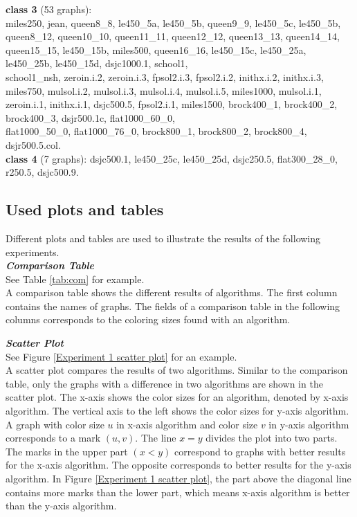 \documentclass[12pt,a4paper,twoside]{scrartcl}
\numberwithin{equation}{section}
\begin{document}
\textbf{class 3} (53 graphs):\\ miles250, jean, queen8\_8, le450\_5a, le450\_5b, queen9\_9, le450\_5c, le450\_5b, queen8\_12, queen10\_10, queen11\_11, queen12\_12, queen13\_13, queen14\_14, queen15\_15, le450\_15b, miles500, queen16\_16, le450\_15c, le450\_25a, le450\_25b, le450\_15d, dsjc1000.1, school1,\\ school1\_nsh, zeroin.i.2, zeroin.i.3, fpsol2.i.3, fpsol2.i.2, inithx.i.2, inithx.i.3, miles750, mulsol.i.2, mulsol.i.3, mulsol.i.4, mulsol.i.5, miles1000, mulsol.i.1, zeroin.i.1, inithx.i.1, dsjc500.5, fpsol2.i.1, miles1500, brock400\_1, brock400\_2, brock400\_3, dsjr500.1c, flat1000\_60\_0,\\ flat1000\_50\_0, flat1000\_76\_0, brock800\_1, brock800\_2, brock800\_4, dsjr500.5.col.\\

\textbf{class 4} (7 graphs): dsjc500.1, le450\_25c, le450\_25d, dsjc250.5, flat300\_28\_0, r250.5, dsjc500.9. 
 \subsection{Used plots and tables}
Different plots and tables are used to illustrate the results of the following experiments.\\

\emph{\textbf{Comparison Table}}\\
See Table \ref{tab:com} for example.\\
A comparison table shows the different results of algorithms. The first column contains the names of graphs. The fields of a comparison table in the following columns corresponds to the coloring sizes found with an algorithm.

\emph{\textbf{Scatter Plot}}\\
See Figure \ref{Experiment 1 scatter plot} for an example.\\
A scatter plot compares the results of two algorithms. Similar to the comparison table, only the graphs with a difference in two algorithms are shown in the scatter plot.  The x-axis shows the color sizes for an algorithm, denoted by x-axis algorithm. The vertical axis to the left shows the color sizes for  y-axis algorithm. A graph with color size $u$ in x-axis algorithm and color size $v$ in y-axis algorithm corresponds to a mark $(u, v)$. The line $x = y$ divides the plot into two parts. The marks in the upper part $(x < y)$ correspond to graphs with better results for the x-axis algorithm. The opposite corresponds to better results for the y-axis algorithm. 
 In Figure \ref{Experiment 1 scatter plot}, the part above the diagonal line contains more marks than the lower part, which means x-axis algorithm is better than the y-axis algorithm.\\
 
\end{document}
